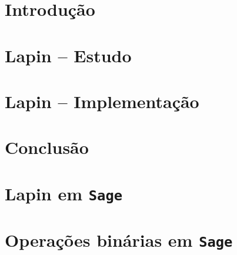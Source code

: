 \documentclass[11pt,a4paper,notitlepage]{report} %
\newcommand{\sage}{\texttt{Sage}}
\begin{document}

%
\newpage
%
\begin{abstract}
\thispagestyle{plain} %

\end{abstract}
\newpage
%
\tableofcontents
\newpage
%
\chapter{Introdução}

\chapter{Lapin -- Estudo}

\chapter{Lapin -- Implementação}


%
\chapter{Conclusão}

%
%

\nocite{*} %

%
\appendix
\appendixpage
\addappheadtotoc
\chapter{Lapin em \sage}\label{appendix:lapin}

\chapter{Operações binárias em \sage}\label{appendix:bin-ops}

\end{document}
